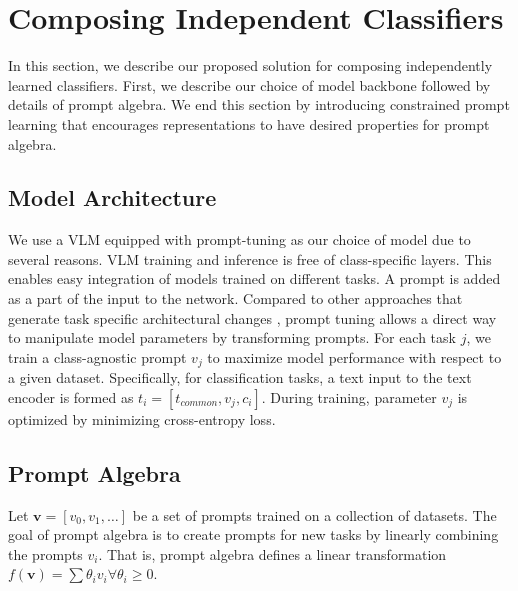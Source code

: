 \documentclass[10pt,twocolumn,letterpaper]{article}
\begin{document}

\section{Composing Independent Classifiers} 
In this section, we describe our proposed solution for composing independently learned classifiers. First, we describe our choice of model backbone followed by details of prompt algebra. We end this section by introducing constrained prompt learning that encourages representations to have desired properties for prompt algebra. 



\subsection{Model Architecture}
 We use a VLM equipped with prompt-tuning as our choice of model due to several reasons. VLM training and inference is free of class-specific layers. This enables easy integration of models trained on different tasks. A prompt is added as a part of the input to the network. Compared to other approaches that generate task specific architectural changes \cite{sung2022vladapter}, prompt tuning allows a direct way to manipulate model parameters by transforming prompts.
 For each task $j$, we train a class-agnostic prompt $ v_j$ to maximize model performance with respect to a given dataset. Specifically, for classification tasks, a text input to the text encoder is formed as $t_i = [ t_{common} , v_j  , c_i ]$. During training, parameter $ v_j $ is optimized by minimizing cross-entropy loss.
 
 \subsection{Prompt Algebra}
 Let $\mathbf{v} = [ v_0, v_1, \dots] $ be a set of prompts trained on a collection of datasets. The goal of prompt algebra is to create prompts for new tasks by  linearly combining the prompts $v_i$. That is, prompt algebra defines a linear transformation $f(\mathbf{v}) = \sum \theta_i v_i \forall \theta_i \geq 0$.
 
\end{document}
